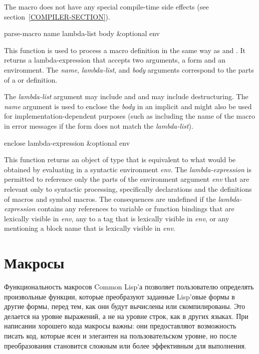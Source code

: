 \begin{newer}
\begin{defmac}
  The  macro does not have any special compile-time
  side effects (see section~\ref{COMPILER-SECTION}).
\end{defmac}

\begin{defun}[Function]
parse-macro name lambda-list body &optional env

  This function is used to process a macro definition in the same way
  as  and .  It returns a lambda-expression that accepts
  two arguments, a form and an environment.  The \emph{name}, \emph{lambda-list},
  and \emph{body} arguments correspond to the parts of a  or 
  definition.

  The \emph{lambda-list} argument may include  and 
  and may include destructuring.
  The \emph{name}
  argument is used to enclose the \emph{body} in an implicit  and might also
  be used for implementation-dependent purposes (such as including the name of
  the macro in error messages if the form does not match the \emph{lambda-list}).
\end{defun}

\begin{defun}[Function]
enclose lambda-expression &optional env

  This function returns an object of type  that is equivalent to what
  would be obtained by evaluating 
  in a syntactic
  environment \emph{env}.  The \emph{lambda-expression} is permitted to reference only the
  parts of the environment argument \emph{env} that are relevant only to syntactic
  processing, specifically declarations and the definitions of macros and
  symbol macros.  The consequences are undefined if the \emph{lambda-expression}
  contains any references to variable or function bindings that are 
  lexically visible in \emph{env}, any  to a tag that is lexically visible in 
  \emph{env}, or any  mentioning a block name that is lexically 
  visible in \emph{env}.
\end{defun}  
\end{newer}

\else

\chapter{Макросы}
\label{MACROS}

Функциональность макросов Common Lisp'а позволяет пользователю определять
произвольные функции, которые преобразуют заданные Lisp'овые формы в другие
формы, перед тем, как они будут вычислены или скомпилированы. Это делается на
уровне выражений, а не на уровне строк, как в других языках. При написании
хорошего кода макросы важны: они предоставляют возможность писать код, которые
ясен и элегантен на пользовательском уровне, но после преобразования становится
сложным или более эффективным для выполнения.

